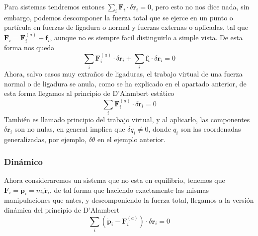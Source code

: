 Para sistemas tendremos entones $\sum_i \mathbf{F}_i \cdot \delta \mathbf{r}_i = 0$, pero esto no nos dice nada, sin embargo, podemos descomponer la fuerza total que se ejerce en un punto o partícula en fuerzas de ligadura o normal y fuerzas externas o aplicadas, tal que $\mathbf{F}_i = \mathbf{F}_i^{(a)}+\mathbf{f}_i$, aunque no es siempre facil distinguirlo a simple vista. De esta forma nos queda
\begin{equation} \label{2.4.1}
    \sum_i \mathbf{F}_i^{(a)} \cdot \delta \mathbf{r}_i + \sum_i \mathbf{f}_i \cdot \delta \mathbf{r}_i = 0
\end{equation} 
Ahora, salvo casos muy extraños de ligaduras, el trabajo virtual de una fuerza normal o de ligadura se anula, como se ha explicado en el apartado anterior, de esta forma llegamos al principio de D'Alambert estático
\begin{equation} \label{2.4.2}
    \sum_i \mathbf{F}_i^{(a)} \cdot \delta \mathbf{r}_i = 0
\end{equation} 
También es llamado principio del trabajo virtual, y al aplicarlo, las componentes $\delta \mathbf{r}_i$ son no nulas, en general implica que $\delta q_i \neq 0$, donde $q_i$ son las coordenadas generalizadas, por ejemplo, $\delta \theta$ en el ejemplo anterior.
\subsubsection{Dinámico}
Ahora consideraremos un sistema que no esta en equilibrio, tenemos que $\mathbf{F}_i = \dot{\mathbf{p}}_i = m_i \ddot{\mathbf{r}}_i$, de tal forma que haciendo exactamente las mismas manipulaciones que antes, y descomponiendo la fuerza total, llegamos a la versión dinámica del principio de D'Alambert
\begin{equation} \label{2.4.3}
    \sum_i (\dot{\mathbf{p}}_i-\mathbf{F}_i^{(a)}) \cdot \delta \mathbf{r}_i = 0
\end{equation} 
\vspace{-25pt}

